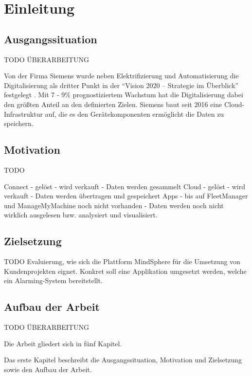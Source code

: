 \chapter{Einleitung}
\label{cha:Einleitung}

\section{Ausgangssituation}
TODO ÜBERARBEITUNG
\vspace{\baselineskip}
\vspace{\baselineskip}

Von der Firma Siemens wurde neben Elektrifizierung und Automatisierung die Digitalisierung als dritter Punkt in der "`Vision 2020 -- Strategie im Überblick"' festgelegt \parencite{SiemensVision2020}. Mit 7 - 9\% prognostiziertem Wachstum hat die Digitalisierung dabei den größten Anteil an den definierten Zielen. Siemens baut seit 2016 eine Cloud-Infrastruktur auf, die es den Gerätekomponenten ermöglicht die Daten zu speichern. 



\section{Motivation}
TODO

Connect - gelöst - wird verkauft - Daten werden gesammelt
Cloud - gelöst - wird verkauft - Daten werden übertragen und gespeichert
Apps - bis auf FleetManager und ManageMyMachine noch nicht vorhanden - Daten werden noch nicht wirklich ausgelesen bzw. analysiert und visualisiert.


\section{Zielsetzung}
TODO
Evaluierung, wie sich die Plattform MindSphere für die Umsetzung von Kundenprojekten eignet. Konkret soll eine Applikation umgesetzt werden, welche ein Alarming-System bereitstellt. 


\section{Aufbau der Arbeit}
TODO ÜBERARBEITUNG
\vspace{\baselineskip}
\vspace{\baselineskip}

Die Arbeit gliedert sich in fünf Kapitel. 

Das erste Kapitel beschreibt die Ausgangssituation, Motivation und Zielsetzung sowie den Aufbau der Arbeit.

